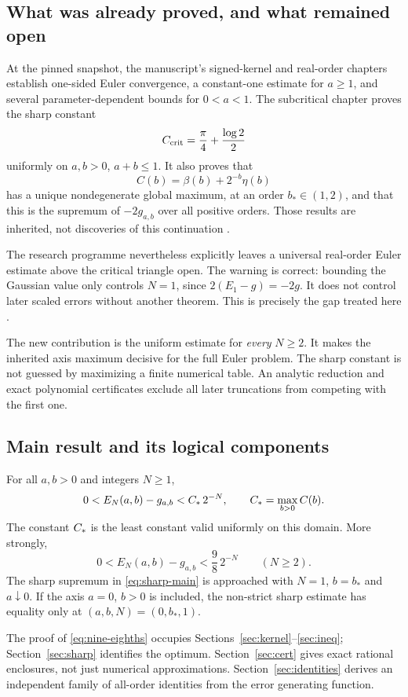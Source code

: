 \subsection{What was already proved, and what remained open}
At the pinned snapshot, the manuscript's signed-kernel and real-order chapters establish one-sided Euler convergence, a constant-one estimate for $a\ge1$, and several parameter-dependent bounds for $0<a<1$. The subcritical chapter proves the sharp constant
\begin{equation}\label{eq:critical}
 C_{\rm crit}=\frac\pi4+\frac{\log2}{2}
\end{equation}
uniformly on $a,b>0$, $a+b\le1$. It also proves that
\begin{equation}\label{eq:axisC}
 C(b)=\beta(b)+2^{-b}\eta(b)
\end{equation}
has a unique nondegenerate global maximum, at an order $b_*\in(1,2)$, and that this is the supremum of $-2g_{a,b}$ over all positive orders. Those results are inherited, not discoveries of this continuation \cite{RepoSubcritical,RepoEuler}.

The research programme nevertheless explicitly leaves a universal real-order Euler estimate above the critical triangle open. The warning is correct: bounding the Gaussian value only controls $N=1$, since $2(E_1-g)=-2g$. It does not control later scaled errors without another theorem. This is precisely the gap treated here \cite{RepoDiscovery}.

The new contribution is the uniform estimate for \emph{every} $N\ge2$. It makes the inherited axis maximum decisive for the full Euler problem. The sharp constant is not guessed by maximizing a finite numerical table. An analytic reduction and exact polynomial certificates exclude all later truncations from competing with the first one.

\subsection{Main result and its logical components}
\begin{theorem}\label{thm:main}
For all $a,b>0$ and integers $N\ge1$,
\begin{equation}\label{eq:sharp-main}
 0<E_N(a,b)-g_{a,b}<C_*\,2^{-N},
 \qquad C_*=\max_{b>0}C(b).
\end{equation}
The constant $C_*$ is the least constant valid uniformly on this domain. More strongly,
\begin{equation}\label{eq:nine-eighths}
 0<E_N(a,b)-g_{a,b}<\frac98\,2^{-N}\qquad(N\ge2).
\end{equation}
The sharp supremum in \eqref{eq:sharp-main} is approached with $N=1$, $b=b_*$ and $a\downarrow0$. If the axis $a=0$, $b>0$ is included, the non-strict sharp estimate has equality only at $(a,b,N)=(0,b_*,1)$.
\end{theorem}
The proof of \eqref{eq:nine-eighths} occupies Sections~\ref{sec:kernel}--\ref{sec:ineq}; Section~\ref{sec:sharp} identifies the optimum. Section~\ref{sec:cert} gives exact rational enclosures, not just numerical approximations. Section~\ref{sec:identities} derives an independent family of all-order identities from the error generating function.

